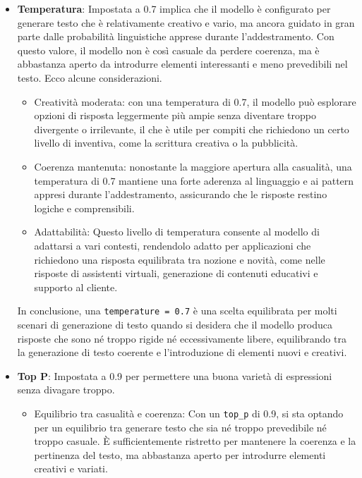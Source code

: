         \begin{itemize}
            \item   
                \textbf{Temperatura}: Impostata a 0.7 implica che il modello è configurato per generare testo che è relativamente creativo e vario, ma ancora guidato in gran parte dalle probabilità linguistiche apprese durante l'addestramento. Con questo valore, il modello non è così casuale da perdere coerenza, ma è abbastanza aperto da introdurre elementi interessanti e meno prevedibili nel testo. Ecco alcune considerazioni.
                \begin{itemize}
                    \item Creatività moderata: con una temperatura di 0.7, il modello può esplorare opzioni di risposta leggermente più ampie senza diventare troppo divergente o irrilevante, il che è utile per compiti che richiedono un certo livello di inventiva, come la scrittura creativa o la pubblicità.   

                    \item Coerenza mantenuta: nonostante la maggiore apertura alla casualità, una temperatura di 0.7 mantiene una forte aderenza al linguaggio e ai pattern appresi durante l'addestramento, assicurando che le risposte restino logiche e comprensibili.  
                
                    \item Adattabilità: Questo livello di temperatura consente al modello di adattarsi a vari contesti, rendendolo adatto per applicazioni che richiedono una risposta equilibrata tra nozione e novità, come nelle risposte di assistenti virtuali, generazione di contenuti educativi e supporto al cliente. 
                \end{itemize}
                
                In conclusione, una \texttt{temperature = 0.7} è una scelta equilibrata per molti scenari di generazione di testo quando si desidera che il modello produca risposte che sono né troppo rigide né eccessivamente libere, equilibrando tra la generazione di testo coerente e l'introduzione di elementi nuovi e creativi.  

        \item 
            \textbf{Top P}: Impostata a 0.9 per permettere una buona varietà di espressioni senza divagare troppo. 

            \begin{itemize}
                \item Equilibrio tra casualità e coerenza: Con un \texttt{top\_p} di 0.9, si sta optando per un equilibrio tra generare testo che sia né troppo prevedibile né troppo casuale. È sufficientemente ristretto per mantenere la coerenza e la pertinenza del testo, ma abbastanza aperto per introdurre elementi creativi e variati. 
        

\end{itemize}
\end{itemize}
